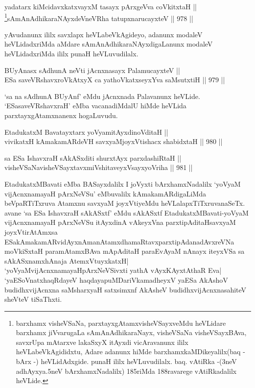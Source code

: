 \begin{shl}
yadatarx kiMcidavxkatxvayxM tasayx pArxgeVva coVkitxtaH || \\
\footnote{barxhamx visheVSaNa, parxtayxgAtamxvisheVSayxveMdu heVLidare barxhamx jiVvarugaLa sAmAnAdhikaraNayx, visheVSaNa visheVSayxBAva, savxrUpa mAtarxve lakaSxyX itAyxdi vicAravanunx ililx heVLabeVkAgididxtu, Adare adanunx hiMde barxhamxkaMDikeyalilx(baq - bArx -) heVLidAdxgide. punaH ililx heVLuvudilalx. baq. vAtiRka -(3neV adhAyxya.5neV bArxhamxNadalilx) 185riMda 188ravarege vAtiRkadalilx heVLide.}sAmAnAdhikaraNAyxdeVneVRha tatupxnarucayxteV \hfill || 978 ||  
\end{shl}


\begin{artha}
yAvudanunx ililx savxlapx heVLabeVkAgideyo, adanunx modaleV heVLidadxriMda aMdare sAmAnAdhikaraNAyxdigaLanunx modaleV heVLidadxriMda ililx punaH heVLuvudilalx.
\end{artha}


\begin{shl}
BUyAnasx sAdhunA neVti jAcnxnasayx PalamucayxteV || \\
ESa saveVRshavxroVkAtxyX ca yathoVkatxseyxYva saMsutxtiH \hfill || 979 ||  
\end{shl}

\begin{artha}
`sa na sAdhunA BUyAnf' eMdu jAcnxnada Palavanunx heVLide. `ESasaveVRshavxraH' eMba vacanadiMdalU hiMde heVLida parxtayxgAtamxnanenx hogaLuvudu.
\end{artha}


\begin{shl}
EtadukatxM Bavatayxtarx yoV\s yamitAyxdinoVditaH || \\
vivikatxH kAmakamARdeVH savxyaMjoyxVtishacx shabidxtaH \hfill || 980 ||  
\end{shl}
				
\begin{shl}
sa ESa IshavxraH sAkASxditi shurxtAyx parxdashiRtaH || \\
visheVSaNavisheVSayxtavxmiVshitaveyxVsayxyoVriha \hfill || 981 ||  
\end{shl}

\begin{artha}
EtadukatxMBavati eMba BASayxdalilx I joVyxti bArxhamxNadalilx `yoV\s yaM vijAcnxnamayaH pArxNeVSu' eMbuvalilx kAmakamARdigaLiMda beVpaRTiTxruva Atamxnu savxyaM joyxVtiyeMdu heVLalapxTiTxruvanaSeTx. avane `sa ESa IshavxraH sAkASxtf' eMdu sAkASxtf EtadukatxMBavati-yoV\s yaM vijAcnxnamayaH pArxNeVSu itAyxdinA vAkeyxVna parxtipAditaHsavxyaM joyxVtirAtAmxsa ESakAmakamARvidAyxnAmanAtamxdhamaRtavxparxtipAdanadAvxreVNa moVkiSxtaH paramAtamxBAva mApAditaH paraEvAyaM nAnayx iteyxVSa sa sAkASxnamxhAnaja AtemxVtuyxkatxH| `yoV\s yaMvijAcnxnamayaHpArxNeVSivxti yathA vAyxKAyxtAthaR Eva| `yaESoV\s natxhaqRdayeV haqdayapuMDariVkamadheyxV yaESa AkAshoV budidhxvijAcnxna saMsharxyaH satxsimxnf AkAsheV budidhxvijAcnxnasahiteV sheVteV tiSaThxti.
\end{artha}


